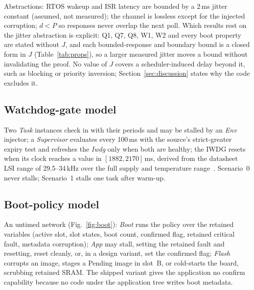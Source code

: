 \documentclass[conference,a4paper]{IEEEtran}
\begin{document}
Abstractions: RTOS wakeup and ISR latency are bounded by a 2\,ms jitter constant (assumed, not measured); the channel is lossless except for the injected corruption; $d<P$ so responses never overlap the next poll. Which results rest on the jitter abstraction is explicit: Q1, Q7, Q8, W1, W2 and every boot property are stated without $J$, and each bounded-response and boundary bound is a closed form in $J$ (Table~\ref{tab:props}), so a larger measured jitter moves a bound without invalidating the proof. No value of $J$ covers a scheduler-induced delay beyond it, such as blocking or priority inversion; Section~\ref{sec:discussion} states why the code excludes it.



\subsection{Watchdog-gate model}
Two \emph{Task} instances check in with their periods and may be stalled by an \emph{Env} injector; a \emph{Supervisor} evaluates every 100\,ms with the source's strict-greater expiry test and refreshes the \emph{Iwdg} only when both are healthy; the IWDG resets when its clock reaches a value in $[1882,2170]$\,ms, derived from the datasheet LSI range of 29.5--34\,kHz over the full supply and temperature range~\cite{st2021ds12589}. Scenario~0 never stalls; Scenario~1 stalls one task after warm-up.





\subsection{Boot-policy model}
An untimed network (Fig.~\ref{fig:boot}): \emph{Boot} runs the policy over the retained variables (active slot, slot states, boot count, confirmed flag, retained critical fault, metadata corruption); \emph{App} may stall, setting the retained fault and resetting, reset cleanly, or, in a design variant, set the confirmed flag; \emph{Flash} corrupts an image, stages a Pending image in slot~B, or cold-starts the board, scrubbing retained SRAM. The shipped variant gives the application no confirm capability because no code under the application tree writes boot metadata.
\end{document}
